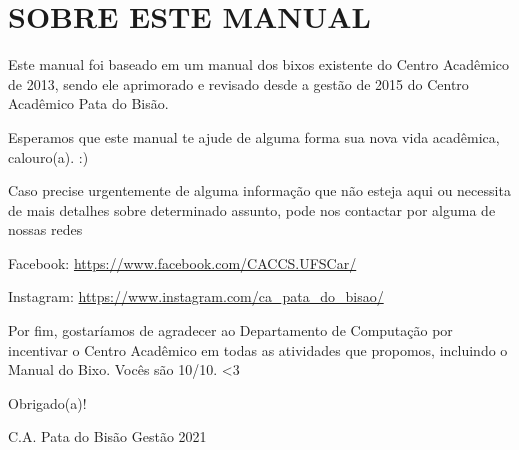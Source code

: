 \section{SOBRE ESTE MANUAL}
Este manual foi baseado em um manual dos bixos existente do Centro Acadêmico de 2013, sendo ele aprimorado e revisado desde a gestão de 2015 do Centro Acadêmico Pata do Bisão.

Esperamos que este manual te ajude de alguma forma sua nova vida acadêmica, calouro(a). :)

Caso precise urgentemente de alguma informação que não esteja aqui ou necessita de mais detalhes sobre determinado assunto, pode nos contactar por alguma de nossas redes 

Facebook: \url{https://www.facebook.com/CACCS.UFSCar/}

Instagram: \url{https://www.instagram.com/ca_pata_do_bisao/}


Por fim, gostaríamos de agradecer ao Departamento de Computação por incentivar o Centro Acadêmico em todas as atividades que propomos, incluindo o Manual do Bixo. Vocês são 10/10. <3

\begin{flushright}
  Obrigado(a)!

  C.A. Pata do Bisão Gestão 2021
\end{flushright}
